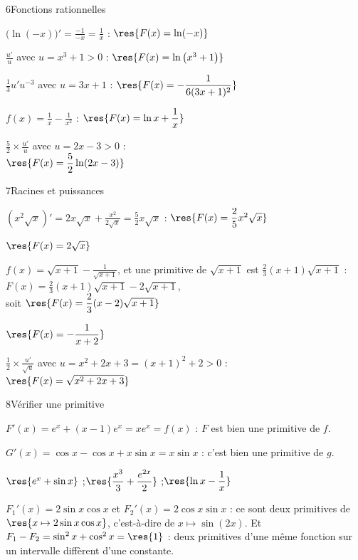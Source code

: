 \begin{deuxcolonnes}
\begin{corrige}{6}{Fonctions rationnelles}
\begin{questions}
  \item $\big(\ln(-x)\big)'=\frac{-1}{-x}=\frac1x$ : $\res{F(x)=\ln(-x)}$
  \item $\frac{u'}{u}$ avec $u=x^{3}+1>0$ : $\res{F(x)=\ln\left(x^{3}+1\right)}$
  \item $\frac13u'u^{-3}$ avec $u=3x+1$ : $\res{F(x)=-\dfrac{1}{6(3x+1)^{2}}}$
  \item $f(x)=\frac1x-\frac{1}{x^{2}}$ : $\res{F(x)=\ln x+\dfrac1x}$
  \item $\frac52\times\frac{u'}{u}$ avec $u=2x-3>0$ :\\ $\res{F(x)=\dfrac52\ln(2x-3)}$
\end{questions}
\end{corrige}

\begin{corrige}{7}{Racines et puissances}
\begin{questions}
  \item $\left(x^{2}\sqrt x\right)'=2x\sqrt x+\frac{x^{2}}{2\sqrt x}=\frac52x\sqrt x$ : $\res{F(x)=\dfrac25x^{2}\sqrt x}$
  \item $\res{F(x)=2\sqrt x}$
  \item $f(x)=\sqrt{x+1}-\frac{1}{\sqrt{x+1}}$, et une primitive de $\sqrt{x+1}$ est $\frac23(x+1)\sqrt{x+1}$ :\\
    $F(x)=\frac23(x+1)\sqrt{x+1}-2\sqrt{x+1}$,\\ soit $\res{F(x)=\dfrac23(x-2)\sqrt{x+1}}$
  \item $\res{F(x)=-\dfrac{1}{x+2}}$
  \item $\frac12\times\frac{u'}{\sqrt u}$ avec $u=x^{2}+2x+3=(x+1)^{2}+2>0$ :\\ $\res{F(x)=\sqrt{x^{2}+2x+3}}$
\end{questions}
\end{corrige}

\begin{corrige}{8}{Vérifier une primitive}
\begin{questions}
  \item $F'(x)=e^{x}+(x-1)e^{x}=xe^{x}=f(x)$ : $F$ est bien une primitive de $f$.
  \item $G'(x)=\cos x-\cos x+x\sin x=x\sin x$ : c'est bien une primitive de $g$.
  \item $\res{e^{x}+\sin x}$ ;\quad $\res{\dfrac{x^{3}}{3}+\dfrac{e^{2x}}{2}}$ ;\quad $\res{\ln x-\dfrac1x}$
  \item $F_1'(x)=2\sin x\cos x$ et $F_2'(x)=2\cos x\sin x$ : ce sont deux primitives de $\res{x\mapsto2\sin x\cos x}$, c'est-à-dire
    de $x\mapsto\sin(2x)$. Et $F_1-F_2=\sin^{2}x+\cos^{2}x=\res{1}$ : deux primitives d'une même fonction sur un intervalle
    diffèrent d'une constante.
\end{questions}
\end{corrige}

\end{deuxcolonnes}

